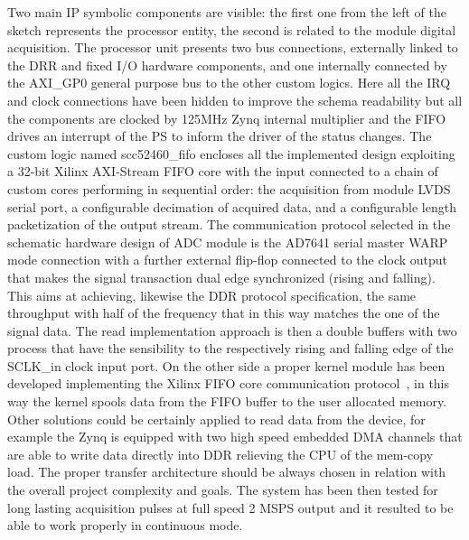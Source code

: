 Two main IP symbolic components are visible: the first one from the left of the sketch represents the processor entity, the second is related to the module digital acquisition. The processor unit presents two bus connections, externally linked to the DRR and fixed I/O hardware components, and one internally connected by the AXI\_GP0 general purpose bus to the other custom logics. Here all the IRQ and clock connections have been hidden to improve the schema readability but all the components are clocked by 125MHz Zynq internal multiplier and the FIFO drives an interrupt of the PS to inform the driver of the status changes. The custom logic named scc52460\_fifo encloses all the implemented design exploiting a 32-bit Xilinx AXI-Stream FIFO core with the input connected to a chain of custom cores performing in sequential order: the acquisition from module LVDS serial port, a configurable decimation of acquired data, and a configurable length packetization of the output stream. The communication protocol selected in the schematic hardware design of ADC module is the AD7641 serial master WARP mode connection with a further external flip-flop connected to the clock output that makes the signal transaction dual edge synchronized (rising and falling). This aims at achieving, likewise the DDR protocol specification, the same throughput with half of the frequency that in this way matches the one of the signal data.  The read implementation approach is then a double buffers with two process that have the sensibility to the respectively rising and falling edge of the SCLK\_in clock input port. On the other side a proper kernel module has been developed implementing the Xilinx FIFO core communication protocol~\cite{axi4_stream_fifo_2016}, in this way the kernel spools data from the FIFO buffer to the user allocated memory. Other solutions could be certainly applied to read data from the device, for example the Zynq is equipped with two high speed embedded DMA channels that are able to write data directly into DDR relieving the CPU of the mem-copy load. The proper transfer architecture should be always chosen in relation with the overall project complexity and goals. The system has been then tested for long lasting acquisition pulses at full speed 2 MSPS output and it resulted to be able to work properly in continuous mode. 

